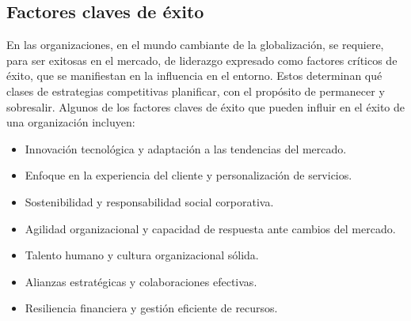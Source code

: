 \subsection{Factores claves de éxito}
En las organizaciones, en el mundo cambiante de la globalización, se requiere, para ser exitosas en el mercado, de liderazgo expresado como factores críticos de éxito, que se manifiestan en la influencia en el entorno. Estos determinan qué clases de estrategias competitivas planificar, con el propósito de permanecer y sobresalir.\cite{factores-exito}
Algunos de los factores claves de éxito que pueden influir en el éxito de una organización incluyen:

\begin{itemize}
    \item Innovación tecnológica y adaptación a las tendencias del mercado.
    \item Enfoque en la experiencia del cliente y personalización de servicios.
    \item Sostenibilidad y responsabilidad social corporativa.
    \item Agilidad organizacional y capacidad de respuesta ante cambios del mercado.
    \item Talento humano y cultura organizacional sólida.
    \item Alianzas estratégicas y colaboraciones efectivas.
    \item Resiliencia financiera y gestión eficiente de recursos.
\end{itemize}
